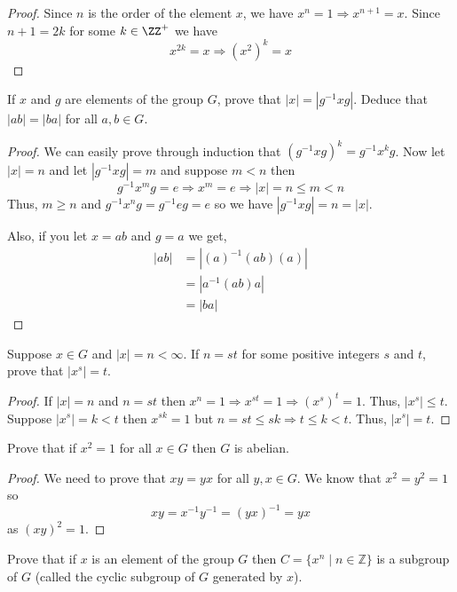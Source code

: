 \begin{proof}
    Since $n$ is the order of the element $x$, we have $x^n=1 \Rightarrow x^{n+1}=x$. Since $n+1 = 2k$ for some $k \in \ZZ^+$ we have
    \[ x^{2k} = x \Rightarrow (x^2)^k=x \]  
\end{proof}

\begin{problem}
    If $x$ and $g$ are elements of the group $G$, prove that $|x| = |g^{-1}xg|$. Deduce that $|ab| = |ba|$ for all $a, b \in G$.
\end{problem}

\begin{proof}
    We can easily prove through induction that $(g^{-1}xg)^k=g^{-1}x^kg$. Now let $|x|=n$ and let $|g^{-1}xg|=m$ and suppose
    $m < n$ then 
    \[ g^{-1}x^mg = e \Rightarrow x^m=e \Rightarrow |x| = n \le m < n \]
    Thus, $m \ge n$ and $g^{-1}x^ng=g^{-1} e g = e$ so we have $|g^{-1}xg|=n=|x|$.

    Also, if you let $x=ab$ and $g=a$ we get,
    \begin{align*}
        |ab| &= |(a)^{-1} (ab) (a)| \\
         &= |a^{-1}(ab)a| \\
         &= |ba|
    \end{align*}
\end{proof}

\begin{problem}
    Suppose $x \in G$ and $|x| = n < \infty$. If $n = st$ for some positive integers $s$ and $t$, prove that $|x^s| = t$.
\end{problem}

\begin{proof}
    If $|x|=n$ and $n=st$ then $x^n=1 \Rightarrow x^{st}=1 \Rightarrow (x^s)^t=1$. Thus, $|x^s| \le t$.
    Suppose $|x^s|=k<t$ then $x^{sk}=1$ but $n=st \le sk \Rightarrow t \le k < t$. Thus, $|x^s|=t$.
\end{proof}

\begin{problem}
    Prove that if $x^2 = 1$ for all $x \in G$ then $G$ is abelian.
\end{problem}

\begin{proof}
    We need to prove that $xy=yx$ for all $y,x \in G$. We know that $x^2=y^2=1$ so 
    \[ xy=x^{-1}y^{-1}=(yx)^{-1}=yx \]
    as $(xy)^2=1$.
\end{proof}

\begin{problem}
    Prove that if $x$ is an element of the group $G$ then $C=\{x^n \mid n \in \mathbb{Z}\}$ is 
    a subgroup of $G$ (called the cyclic subgroup of $G$ generated by $x$).
\end{problem}

